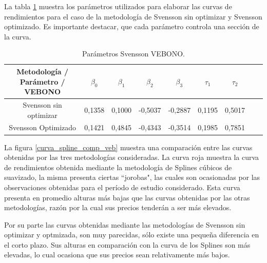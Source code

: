 \newpage

\hspace{0.4cm} La tabla \ref{tabla5} muestra los par\'ametros utilizados para elaborar las curvas de rendimientos para el caso de la metodolog\'ia de Svensson sin optimizar y Svensson optimizado. Es importante destacar, que cada par\'ametro controla una secci\'on de la curva.

\begin{table}[H]
\centering
{\begin{tabular}[t]{|c |c |c |c |c |c |c |c |r|}
\hline
Metodolog\'ia / Par\'ametro / VEBONO & $\beta_{0}$ & $\beta_{1}$ & $\beta_{2}$ & $\beta_{3}$  &  $\tau_{1}$ & $\tau_{2}$ \\
\hline
Svensson sin optimizar & 0,1358 & 0,1000 & -0,5037 & -0,2887 & 0,1195 & 0,5017\\
\hline
Svensson Optimizado & 0,1421 & 0,4845 & -0,4343 & -0,3514 & 0,1985 & 0,7851 \\
\hline
\end{tabular}}
\caption{Par\'ametros Svensson VEBONO.}
\label{tabla5}
\end{table}

\vspace{0.5cm}

\hspace{0.4cm} La figura \ref{curva_spline_comp_veb} muestra una comparaci\'on entre las curvas obtenidas por las tres metodolog\'ias consideradas. La curva roja muestra la curva de rendimientos obtenida mediante la metodolog\'ia de Splines c\'ubicos de suavizado, la misma presenta ciertas ``jorobas", las cuales son ocasionadas por las observaciones obtenidas para el per\'iodo de estudio considerado. Esta curva presenta en promedio alturas m\'as bajas que las curvas obtenidas por las otras metodolog\'ias, raz\'on por la cual sus precios tender\'an a ser m\'as elevados.

\hspace{0.4cm} Por su parte las curvas obtenidas mediante las metodolog\'ias de Svensson sin optimizar y optmizada, son muy parecidas, s\'olo existe una peque\~na diferencia en el corto plazo. Sus alturas en comparaci\'on con la curva de los Splines son m\'as elevadas, lo cual ocasiona que sus precios sean relativamente m\'as bajos.

\newpage

